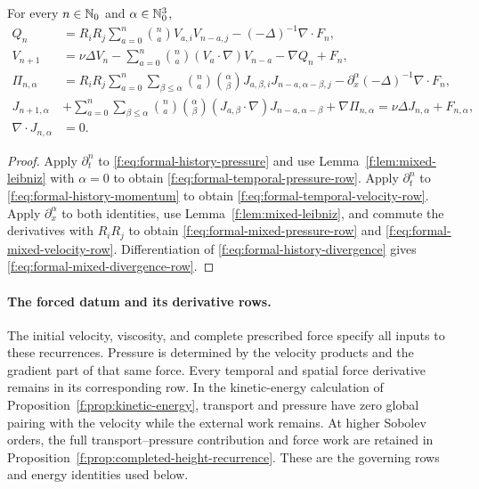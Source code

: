 \begin{proposition}
\label{f:prop:formal-mixed-recurrences}
For every \(n\in\mathbb N_0\) and \(\alpha\in\mathbb N_0^3\),
\begin{align}
 Q_n
 &=R_iR_j
 \sum_{a=0}^{n}\binom na V_{a,i}V_{n-a,j}
 -(-\Delta)^{-1}\nabla\cdot F_n,
 \label{f:eq:formal-temporal-pressure-row}\\
 V_{n+1}
 &=
 \nu\Delta V_n
 -\sum_{a=0}^{n}\binom na(V_a\cdot\nabla)V_{n-a}
 -\nabla Q_n+F_n,
 \label{f:eq:formal-temporal-velocity-row}\\
 \Pi_{n,\alpha}
 &=R_iR_j
 \sum_{a=0}^{n}\sum_{\beta\le\alpha}
 \binom na\binom{\alpha}{\beta}
 J_{a,\beta,i}J_{n-a,\alpha-\beta,j}
 -\partial_x^\alpha(-\Delta)^{-1}\nabla\cdot F_n,
 \label{f:eq:formal-mixed-pressure-row}\\
 J_{n+1,\alpha}
 &+
 \sum_{a=0}^{n}\sum_{\beta\le\alpha}
 \binom na\binom{\alpha}{\beta}
 (J_{a,\beta}\cdot\nabla)
 J_{n-a,\alpha-\beta}
 +\nabla\Pi_{n,\alpha}
 =\nu\Delta J_{n,\alpha}+F_{n,\alpha},
 \label{f:eq:formal-mixed-velocity-row}\\
 \nabla\cdot J_{n,\alpha}&=0.
 \label{f:eq:formal-mixed-divergence-row}
\end{align}
\end{proposition}

\begin{proof}
Apply \(\partial_t^n\) to \eqref{f:eq:formal-history-pressure} and use
Lemma~\ref{f:lem:mixed-leibniz} with \(\alpha=0\) to obtain
\eqref{f:eq:formal-temporal-pressure-row}.  Apply \(\partial_t^n\) to
\eqref{f:eq:formal-history-momentum} to obtain
\eqref{f:eq:formal-temporal-velocity-row}.  Apply
\(\partial_x^\alpha\) to both identities, use
Lemma~\ref{f:lem:mixed-leibniz}, and commute the derivatives with \(R_iR_j\)
to obtain \eqref{f:eq:formal-mixed-pressure-row} and
\eqref{f:eq:formal-mixed-velocity-row}.  Differentiation of
\eqref{f:eq:formal-history-divergence} gives
\eqref{f:eq:formal-mixed-divergence-row}.
\end{proof}

\paragraph{The forced datum and its derivative rows.}
The initial velocity, viscosity, and complete prescribed force specify all
inputs to these recurrences.  Pressure is determined by the velocity products
and the gradient part of that same force.  Every temporal and spatial force
derivative remains in its corresponding row.  In the kinetic-energy
calculation of Proposition~\ref{f:prop:kinetic-energy}, transport and pressure
have zero global pairing with the velocity while the external work remains.
At higher Sobolev orders, the full transport--pressure contribution and force
work are retained in Proposition~\ref{f:prop:completed-height-recurrence}.
These are the governing rows and energy identities used below.

